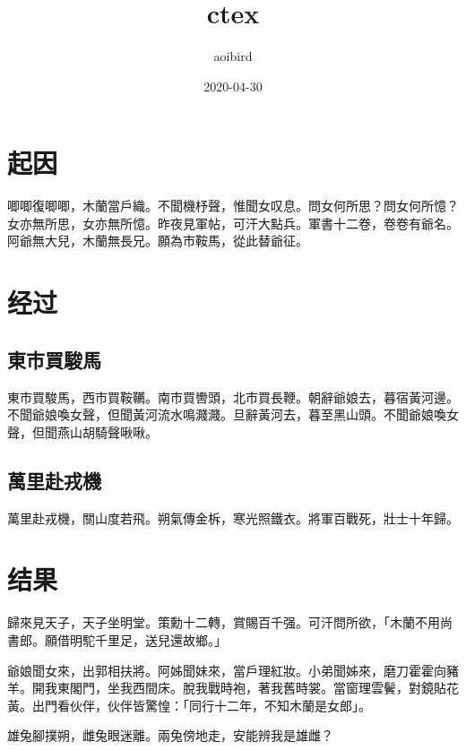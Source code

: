 \documentclass{ctexart}
\title{ctex}
\author{aoibird}
\date{2020-04-30}
\begin{document}
\maketitle

\section{起因}
唧唧復唧唧，木蘭當戶織。不聞機杼聲，惟聞女叹息。問女何所思？問女何所憶？女亦無所思，女亦無所憶。昨夜見軍帖，可汗大點兵。軍書十二卷，卷卷有爺名。阿爺無大兒，木蘭無長兄。願為市鞍馬，從此替爺征。

\section{经过}

\subsection{東市買駿馬}
東市買駿馬，西市買鞍韉。南市買轡頭，北市買長鞭。朝辭爺娘去，暮宿黃河邊。不聞爺娘喚女聲，但聞黃河流水鳴濺濺。旦辭黃河去，暮至黑山頭。不聞爺娘喚女聲，但聞燕山胡騎聲啾啾。

\subsection{萬里赴戎機}
萬里赴戎機，關山度若飛。朔氣傳金柝，寒光照鐵衣。將軍百戰死，壯士十年歸。

\section{结果}
歸來見天子，天子坐明堂。策勳十二轉，賞賜百千强。可汗問所欲，「木蘭不用尚書郎。願借明駝千里足，送兒還故鄉。」

爺娘聞女來，出郭相扶將。阿姊聞妹來，當戶理紅妝。小弟聞姊來，磨刀霍霍向豬羊。開我東閣門，坐我西間床。脫我戰時袍，著我舊時裳。當窗理雲鬢，對鏡貼花黃。出門看伙伴，伙伴皆驚惶：「同行十二年，不知木蘭是女郎」。

雄兔腳撲朔，雌兔眼迷離。兩兔傍地走，安能辨我是雄雌？
\end{document}
